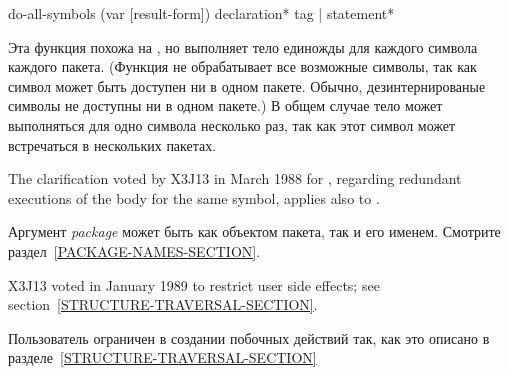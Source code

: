 \begin{defmac}
do-all-symbols (var [result-form])
               {declaration}* {tag | statement}*

Эта функция похожа на , но выполняет тело единожды для каждого
символа каждого пакета. (Функция не обрабатывает все возможные символы, так как
символ может быть доступен ни в одном пакете. Обычно, дезинтернированые символы
не доступны ни в одном пакете.)
В общем случае тело может выполняться для одно символа несколько раз, так как
этот символ может встречаться в нескольких пакетах.

\begin{new}
The clarification voted by X3J13
in March 1988 for 
,
regarding redundant executions of the body for the same symbol,
applies also to .
\end{new}

Аргумент \emph{package} может быть как объектом пакета, так и его
именем. Смотрите раздел~\ref{PACKAGE-NAMES-SECTION}.

\begin{new}
X3J13 voted in January 1989
to restrict user side effects; see section~\ref{STRUCTURE-TRAVERSAL-SECTION}.
\end{new}

Пользователь ограничен в создании побочных действий так, как это описано в
разделе~\ref{STRUCTURE-TRAVERSAL-SECTION}
\end{defmac}

